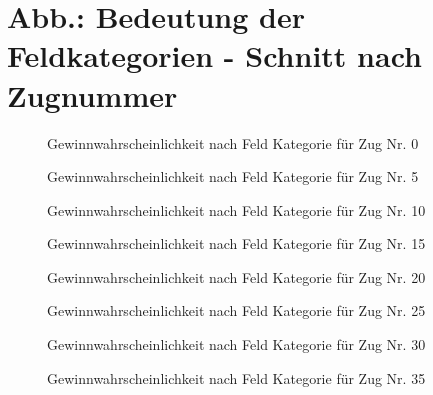 \section*{Abb.: Bedeutung der Feldkategorien - Schnitt nach Zugnummer}

\begin{figure}[ht]
\centering
{}
\caption{Gewinnwahrscheinlichkeit nach Feld Kategorie für Zug Nr. 0}
\label{fig:win-pro-turn-0}
\end{figure}
\begin{figure}[ht]
\centering
{}
\caption{Gewinnwahrscheinlichkeit nach Feld Kategorie für Zug Nr. 5}
\label{fig:win-pro-turn-5}
\end{figure}
\begin{figure}[ht]
\centering
{}
\caption{Gewinnwahrscheinlichkeit nach Feld Kategorie für Zug Nr. 10}
\label{fig:win-pro-turn-10}
\end{figure}
\begin{figure}[ht]
\centering
{}
\caption{Gewinnwahrscheinlichkeit nach Feld Kategorie für Zug Nr. 15}
\label{fig:win-pro-turn-15}
\end{figure}
\begin{figure}[ht]
\centering
{}
\caption{Gewinnwahrscheinlichkeit nach Feld Kategorie für Zug Nr. 20}
\label{fig:win-pro-turn-20}
\end{figure}
\begin{figure}[ht]
\centering
{}
\caption{Gewinnwahrscheinlichkeit nach Feld Kategorie für Zug Nr. 25}
\label{fig:win-pro-turn-25}
\end{figure}
\begin{figure}[ht]
\centering
{}
\caption{Gewinnwahrscheinlichkeit nach Feld Kategorie für Zug Nr. 30}
\label{fig:win-pro-turn-30}
\end{figure}
\begin{figure}[ht]
\centering
{}
\caption{Gewinnwahrscheinlichkeit nach Feld Kategorie für Zug Nr. 35}
\label{fig:win-pro-turn-35}
\end{figure}
